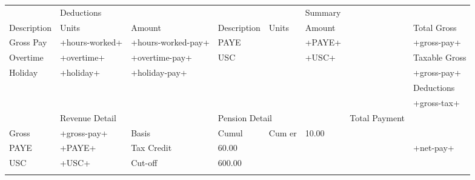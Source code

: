 \documentclass{article}
\begin{document}
\begin{table}[h]
    \begin{tabular}{|llllll|l|l|}
        \hhline{|---|---|~|-|}
        \multicolumn{3}{|l|}{Payments}                                                           & \multicolumn{3}{l|}{Deductions}                                   &  & Summary       \\ \hhline{|~~~|~~~|~|-|}
        Description & Units                            & \multicolumn{1}{l|}{Amount}             & Description                 & Units            & Amount           &  & \cellcolor{Gray} Total Gross   \\ \hhline{|---|---|~|-|}
        Gross Pay   & +hours-worked+                   & \multicolumn{1}{l|}{+hours-worked-pay+} & PAYE                        &                  & +PAYE+           &  & +gross-pay+   \\ \hhline{|~~~|~~~|~|-|}
        Overtime    & +overtime+                       & \multicolumn{1}{l|}{+overtime-pay+}     & USC                         &                  & +USC+            &  & \cellcolor{Gray} Taxable Gross \\ \hhline{|~~~|~~~|~|-|}
        Holiday     & +holiday+                        & \multicolumn{1}{l|}{+holiday-pay+}      &                             &                  &                  &  & +gross-pay+   \\ \hhline{|~~~|~~~|~|-|}
                    &                                  & \multicolumn{1}{l|}{}                   &                             &                  &                  &  & \cellcolor{Gray} Deductions    \\ \hhline{|~~~|~~~|~|-|}
                    &                                  & \multicolumn{1}{l|}{}                   &                             &                  &                  &  & +gross-tax+   \\ \hhline{|---|---|~|-|}
        \multicolumn{2}{|l|}{Cumulative}               & \multicolumn{2}{l|}{Revenue Detail}                                   & \multicolumn{2}{l|}{Pension Detail} &  & \cellcolor{Gray} Total Payment \\ \hhline{|---|---|~|-|}
        Gross       & \multicolumn{1}{l|}{+gross-pay+} & Basis                                   & \multicolumn{1}{l|}{Cumul}  & Cum er           & 10.00            &  & \\
        PAYE        & \multicolumn{1}{l|}{+PAYE+}      & Tax Credit                              & \multicolumn{1}{l|}{60.00}  &                  &                  &  & +net-pay+     \\
        USC         & \multicolumn{1}{l|}{+USC+}       & Cut-off                                 & \multicolumn{1}{l|}{600.00} &                  &                  &  & \\ \hhline{|---|---|~|-|}
    \end{tabular}
\end{table}
\end{document}
